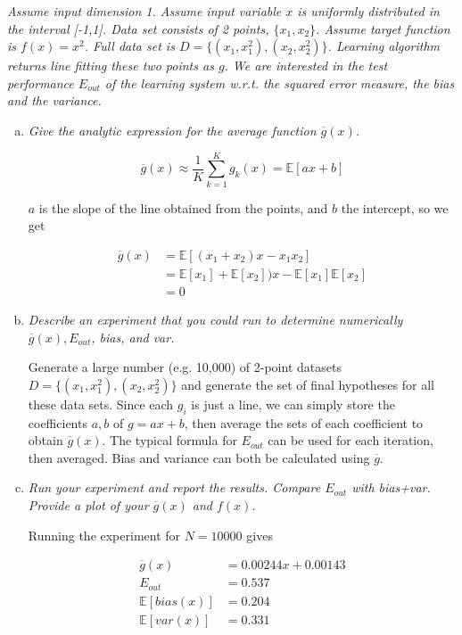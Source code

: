 \documentclass{article}
\begin{document}
\textit{Assume input dimension 1. Assume input variable $x$ is uniformly distributed in the
interval [-1,1]. Data set consists of 2 points, $\{x_1,x_2\}$. Assume target function is 
$f(x) = x^2$. Full data set is $D = \{ (x_1, x_1^2), (x_2, x_2^2) \}$. Learning algorithm
returns line fitting these two points as $g$. We are interested in the test performance $E_{out}$
of the learning system w.r.t. the squared error measure, the bias and the variance.}

\begin{enumerate}[(a)]
  \item \textit{Give the analytic expression for the average function $\overline{g}(x)$.}

    $$\overline{g}(x) \approx \frac{1}{K}\sum_{k=1}^K g_k(x) = \mathbb{E}[ax+b]$$

    $a$ is the slope of the line obtained from the points, and $b$ the intercept, so we get

    \begin{align*}
      \overline{g}(x) &= \mathbb{E}[(x_1 + x_2)x - x_1x_2] \\
      &= \mathbb{E}[x_1] + \mathbb{E}[x_2])x - \mathbb{E}[x_1]\mathbb{E}[x_2] \\
      &= 0
    \end{align*}

  \item \textit{Describe an experiment that you could run to determine numerically 
    $\overline{g}(x), E_{out}$, bias, and var.}

    Generate a large number (e.g. 10,000) of 2-point datasets 
    $D = \{ (x_1, x_1^2), (x_2, x_2^2) \}$ and generate the set of final hypotheses for all these
    data sets. Since each $g_i$ is just a line, we can simply store the coefficients $a,b$ of 
    $g = ax + b$, then average the sets of each coefficient to obtain $\overline{g}(x)$. The
    typical formula for $E_{out}$ can be used for each iteration, then averaged. Bias and
    variance can both be calculated using $\overline{g}$.


  \item \textit{Run your experiment and report the results. Compare $E_{out}$ with bias+var.
    Provide a plot of your $\overline{g}(x)$ and $f(x)$.}

    Running the experiment for $N = 10000$ gives

    \begin{align*}
      \overline{g}(x) &= 0.00244 x + 0.00143 \\
      E_{out} &= 0.537 \\
      \mathbb{E}[bias(x)] &= 0.204 \\
      \mathbb{E}[var(x)] &= 0.331 \\
    \end{align*}
    

\end{enumerate}
\end{document}
